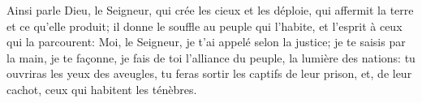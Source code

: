 Ainsi parle Dieu, le Seigneur, qui crée les cieux et les déploie,
	qui affermit la terre et ce qu’elle produit;
	il donne le souffle au peuple qui l’habite,
	et l’esprit à ceux qui la parcourent:
Moi, le Seigneur, je t’ai appelé selon la justice;
	je te saisis par la main, je te façonne,
	je fais de toi l’alliance du peuple, la lumière des nations:
	tu ouvriras les yeux des aveugles,
	tu feras sortir les captifs de leur prison,
	et, de leur cachot, ceux qui habitent les ténèbres.
